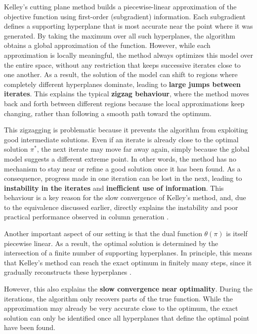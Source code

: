 \documentclass{book}
\theoremstyle{definition}
\newcounter{algorithm_}
\numberwithin{algorithm_}{chapter}
\begin{document}
\bigskip

Kelley's cutting plane method builds a piecewise-linear approximation of the objective function using first-order (subgradient) information. Each subgradient defines a supporting hyperplane that is most accurate near the point where it was generated. By taking the maximum over all such hyperplanes, the algorithm obtains a global approximation of the function. However, while each approximation is locally meaningful, the method always optimizes this model over the entire space, without any restriction that keeps successive iterates close to one another. As a result, the solution of the model can shift to regions where completely different hyperplanes dominate, leading to \textbf{large jumps between iterates}. This explains the typical \textbf{zigzag behaviour}, where the method moves back and forth between different regions because the local approximations keep changing, rather than following a smooth path toward the optimum.

\bigskip

This zigzagging is problematic because it prevents the algorithm from exploiting good intermediate solutions. Even if an iterate is already close to the optimal solution $\pi^*$, the next iterate may move far away again, simply because the global model suggests a different extreme point. In other words, the method has no mechanism to stay near or refine a good solution once it has been found. As a consequence, progress made in one iteration can be lost in the next, leading to \textbf{instability in the iterates} and \textbf{inefficient use of information}. This behaviour is a key reason for the slow convergence of Kelley's method, and, due to the equivalence discussed earlier, directly explains the instability and poor practical performance observed in column generation \cite{benamor2009stabilizing}.

\bigskip

Another important aspect of our setting is that the dual function $\theta(\pi)$ is itself piecewise linear. As a result, the optimal solution is determined by the intersection of a finite number of supporting hyperplanes. In principle, this means that Kelley's method can reach the exact optimum in finitely many steps, since it gradually reconstructs these hyperplanes \cite{ruszczynski2006nonlinear}.

However, this also explains the \textbf{slow convergence near optimality}. During the iterations, the algorithm only recovers parts of the true function. While the approximation may already be very accurate close to the optimum, the exact solution can only be identified once all hyperplanes that define the optimal point have been found.
\end{document}
